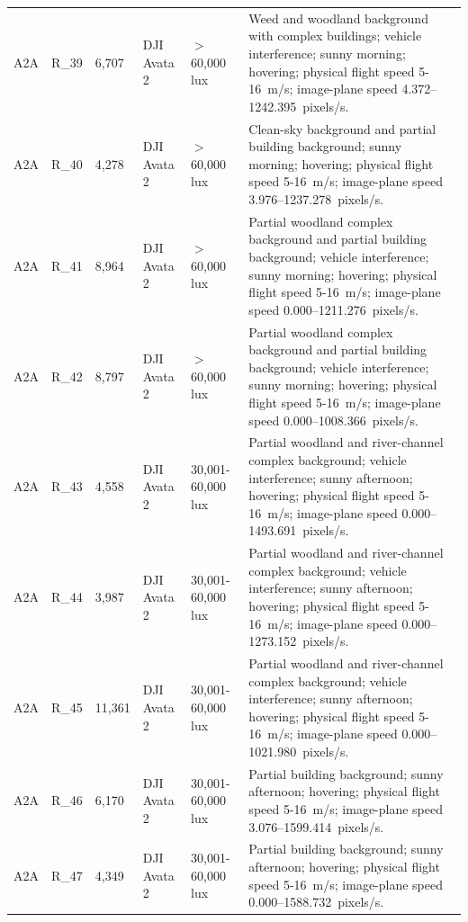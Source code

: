\begin{longtable}{@{}C{0.045\textwidth} C{0.083\textwidth} C{0.075\textwidth} C{0.13\textwidth} C{0.15\textwidth} L{0.48\textwidth}@{}}
A2A & R\_39 & 6,707 & DJI Avata 2 & $>$60,000 lux & Weed and woodland background with complex buildings; vehicle interference; sunny morning; hovering; physical flight speed 5-16~m/s; image-plane speed 4.372--1242.395~pixels/s. \\

A2A & R\_40 & 4,278 & DJI Avata 2 & $>$60,000 lux & Clean-sky background and partial building background; sunny morning; hovering; physical flight speed 5-16~m/s; image-plane speed 3.976--1237.278~pixels/s. \\

A2A & R\_41 & 8,964 & DJI Avata 2 & $>$60,000 lux & Partial woodland complex background and partial building background; vehicle interference; sunny morning; hovering; physical flight speed 5-16~m/s; image-plane speed 0.000--1211.276~pixels/s. \\

A2A & R\_42 & 8,797 & DJI Avata 2 & $>$60,000 lux & Partial woodland complex background and partial building background; vehicle interference; sunny morning; hovering; physical flight speed 5-16~m/s; image-plane speed 0.000--1008.366~pixels/s. \\

A2A & R\_43 & 4,558 & DJI Avata 2 & 30,001-60,000 lux & Partial woodland and river-channel complex background; vehicle interference; sunny afternoon; hovering; physical flight speed 5-16~m/s; image-plane speed 0.000--1493.691~pixels/s. \\

A2A & R\_44 & 3,987 & DJI Avata 2 & 30,001-60,000 lux & Partial woodland and river-channel complex background; vehicle interference; sunny afternoon; hovering; physical flight speed 5-16~m/s; image-plane speed 0.000--1273.152~pixels/s. \\

A2A & R\_45 & 11,361 & DJI Avata 2 & 30,001-60,000 lux & Partial woodland and river-channel complex background; vehicle interference; sunny afternoon; hovering; physical flight speed 5-16~m/s; image-plane speed 0.000--1021.980~pixels/s. \\

A2A & R\_46 & 6,170 & DJI Avata 2 & 30,001-60,000 lux & Partial building background; sunny afternoon; hovering; physical flight speed 5-16~m/s; image-plane speed 3.076--1599.414~pixels/s. \\

A2A & R\_47 & 4,349 & DJI Avata 2 & 30,001-60,000 lux & Partial building background; sunny afternoon; hovering; physical flight speed 5-16~m/s; image-plane speed 0.000--1588.732~pixels/s. \\


\end{longtable}
